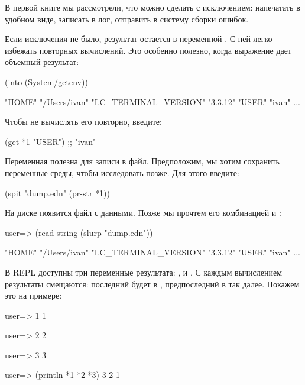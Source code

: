 В первой книге мы рассмотрели, что можно сделать с исключением: напечатать в удобном виде, записать в лог, отправить в систему сборки ошибок.

Если исключения не было, результат остается в переменной . С ней легко избежать повторных вычислений. Это особенно полезно, когда выражение дает объемный результат:

\begin{english}
  \begin{clojure}
(into {} (System/getenv))

{"HOME" "/Users/ivan"
 "LC_TERMINAL_VERSION" "3.3.12"
 "USER" "ivan"
 ...}
  \end{clojure}
\end{english}

Чтобы не вычислять его повторно, введите:

\begin{english}
  \begin{clojure}
(get *1 "USER")
;; "ivan"
  \end{clojure}
\end{english}

Переменная  полезна для записи в файл. Предположим, мы хотим сохранить переменные среды, чтобы исследовать позже. Для этого введите:

\begin{english}
  \begin{clojure}
(spit "dump.edn" (pr-str *1))
  \end{clojure}
\end{english}

На диске появится файл  с данными. Позже мы прочтем его комбинацией  и :

\begin{english}
  \begin{clojure}
user=> (read-string (slurp "dump.edn"))

{"HOME" "/Users/ivan"
 "LC_TERMINAL_VERSION" "3.3.12"
 "USER" "ivan"
 ...}
  \end{clojure}
\end{english}

В REPL доступны три переменные результата: ,  и . С каждым вычислением результаты смещаются: последний будет в , предпоследний в  так далее. Покажем это на примере:

\begin{english}
  \begin{clojure}
user=> 1
1

user=> 2
2

user=> 3
3

user=> (println *1 *2 *3)
3 2 1
  \end{clojure}
\end{english}

